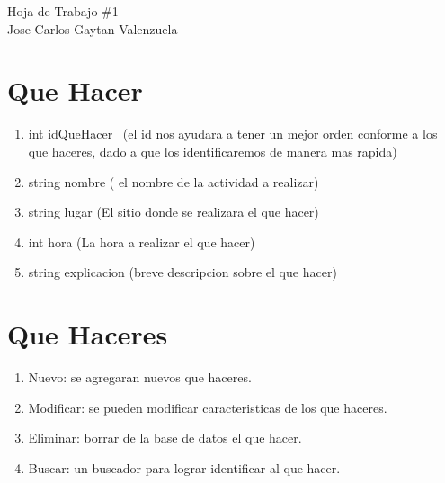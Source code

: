 \documentclass[10pt,a4paper]{article}
\begin{document}
\begin{center}
       \huge {Hoja de Trabajo \#1}\\
        \large{Jose Carlos Gaytan Valenzuela} \
\end{center}
\section{Que Hacer}
\begin{enumerate}


	\item {int idQueHacer \ (el id nos ayudara a tener un mejor orden conforme a los que haceres, dado a que los identificaremos de manera mas rapida)}
	
	\item {string nombre		( el nombre de la actividad a realizar)}
	\item {string lugar  		(El sitio donde se realizara el que hacer)}
	\item {int hora     	 	(La hora a realizar el que hacer)}
	\item {string explicacion  (breve descripcion sobre el que hacer)}
\end{enumerate}
\section{Que Haceres}
\begin{enumerate}
	\item { Nuevo: se agregaran nuevos que haceres. }
	\item {	Modificar: se pueden modificar caracteristicas de los que haceres.}
	\item {	Eliminar: borrar de la base de datos el que hacer.}
	\item { Buscar: un buscador para lograr identificar al que hacer.}
\end{enumerate}
\end{document}
